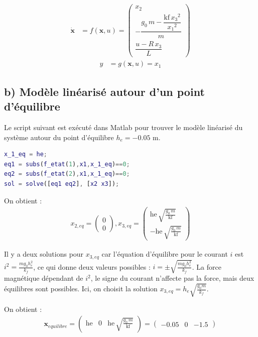 \begin{align}
\dot{\mathbf{x}}&=f(\mathbf{x}, u) =
\left(\begin{array}{c} x_{2}\\[6pt]
    -\dfrac{g_{0}\,m-\dfrac{\mathrm{kf}\,{x_{3}}^2}{{x_{1}}^2}}{m}\\[10pt]
    \dfrac{u-R\,x_{3}}{L} \end{array}\right)
\end{align}
\begin{align}
y&=g(\mathbf{x}, u) =
x_{1}
\end{align}


\subsection{b) Modèle linéarisé autour d'un point d'équilibre}
Le script suivant est exécuté dans Matlab pour trouver le modèle linéarisé du système autour du point d'équilibre $h_e = -0.05$ m.

\begin{lstlisting}[language=Matlab]
x_1_eq = he;
eq1 = subs(f_etat(1),x1,x_1_eq)==0;
eq2 = subs(f_etat(2),x1,x_1_eq)==0;
sol = solve([eq1 eq2], [x2 x3]);
\end{lstlisting}

On obtient :
\begin{align}
x_{2,eq} = \left(\begin{array}{c} 0\\ 0 \end{array}\right),
x_{3,eq}=\left(\begin{array}{c} \mathrm{he}\,\sqrt{\frac{g_{0}\,m}{\mathrm{kf}}}\\ -\mathrm{he}\,\sqrt{\frac{g_{0}\,m}{\mathrm{kf}}} \end{array}\right)
\end{align}

Il y a deux solutions pour $x_{3,eq}$ car l'équation d'équilibre pour le courant $i$ est $i^2 = \frac{m g_0 h_e^2}{k_f}$, ce qui donne deux valeurs possibles : $i = \pm \sqrt{\frac{m g_0 h_e^2}{k_f}}$. La force magnétique dépendant de $i^2$, le signe du courant n'affecte pas la force, mais deux équilibres sont possibles. Ici, on choisit la solution $x_{3,eq} = h_e \sqrt{\frac{g_0 m}{k_f}}$.


On obtient :
\begin{align}
    \mathbf{x}_{equilibre}=\left(\begin{array}{ccc} \mathrm{he} & 0 & \mathrm{he}\,\sqrt{\frac{g_{0}\,m}{\mathrm{kf}}} \end{array}\right)= \left(\begin{array}{ccc} -0.05 & 0 & -1.5 \end{array}\right)
\end{align}


